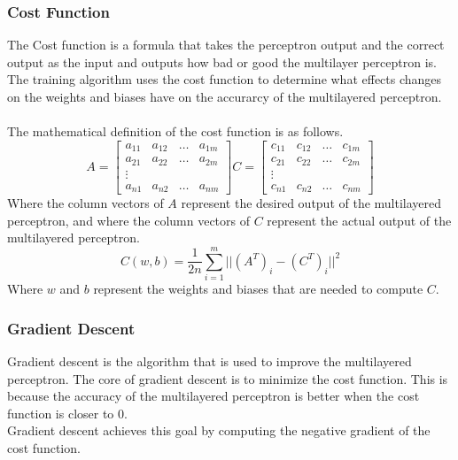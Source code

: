 \subsubsection{Cost Function}
The Cost function is a formula that takes the perceptron output and the correct output as the input and outputs how bad or good the multilayer perceptron is. The training algorithm uses the cost function to determine what effects changes on the weights and biases have on the accurarcy of the multilayered perceptron.\\ \\
The mathematical definition of the cost function is as follows.
$$
	A = \begin{bmatrix}
		a_{11} & a_{12} & \dots & a_{1m} \\
		a_{21} & a_{22} & \dots & a_{2m} \\
		\vdots \\
		a_{n1} & a_{n2} & \dots & a_{nm}
	\end{bmatrix}
	C = \begin{bmatrix}
		c_{11} & c_{12} & \dots & c_{1m} \\
		c_{21} & c_{22} & \dots & c_{2m} \\
		\vdots \\
		c_{n1} & c_{n2} & \dots & c_{nm}
	\end{bmatrix}
$$
Where the column vectors of $A$ represent the desired output of the multilayered perceptron, and where the column vectors of $C$ represent the actual output of the multilayered perceptron.
$$
	C(w, b) = \frac{1}{2n} \sum_{i=1}^{m} ||(A^T)_i-(C^T)_i||^2
$$
Where $w$ and $b$ represent the weights and biases that are needed to compute $C$.

\subsubsection{Gradient Descent}

Gradient descent is the algorithm that is used to improve the multilayered perceptron. The core of gradient descent is to minimize the cost function. This is because the accuracy of the multilayered perceptron is better when the cost function is closer to 0.\\
Gradient descent achieves this goal by computing the negative gradient of the cost function.

